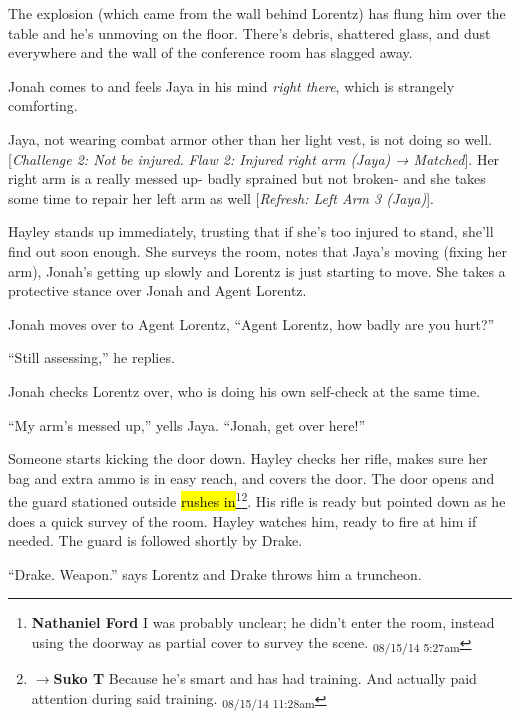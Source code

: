 The explosion (which came from the wall behind Lorentz) has flung him over the table and he's unmoving on the floor.  There's debris, shattered glass, and dust everywhere and the wall of the conference room has slagged away.  



Jonah comes to and feels Jaya in his mind \textit{right there}, which is strangely comforting.



Jaya, not wearing combat armor other than her light vest, is not doing so well. {[}\textit{Challenge 2: Not be injured.  }\textit{Flaw 2: Injured right arm (Jaya)}\textit{ → Matched}{]}.  Her right arm is a really messed up- badly sprained but not broken- and she takes some time to repair her left arm as well {[}\textit{Refresh: Left Arm 3 (Jaya)}{]}.



Hayley stands up immediately, trusting that if she's too injured to stand, she'll find out soon enough.  She surveys the room, notes that Jaya's moving (fixing her arm), Jonah's getting up slowly and Lorentz is just starting to move.  She takes a protective stance over Jonah and Agent Lorentz.



Jonah moves over to Agent Lorentz, ``Agent Lorentz, how badly are you hurt?''

``Still assessing,'' he replies.

Jonah checks Lorentz over, who is doing his own self-check at the same time.

``My arm's messed up,'' yells Jaya. ``Jonah, get over here!'' 



Someone starts kicking the door down.  Hayley checks her rifle, makes sure her bag and extra ammo is in easy reach, and covers the door.  The door opens and the guard stationed outside \hl{rushes in}\footnote{\textbf{Nathaniel Ford }I was probably unclear; he didn't enter the room, instead using the doorway as partial cover to survey the scene. \textsubscript{08/15/14 5:27am}}\footnote{$\rightarrow$\textbf{Suko T }Because he's smart and has had training.  And actually paid attention during said training. \textsubscript{08/15/14 11:28am}}.  His rifle is ready but pointed down as he does a quick survey of the room.  Hayley watches him, ready to fire at him if needed.  The guard is followed shortly by Drake.  

``Drake.  Weapon.'' says Lorentz and Drake throws him a truncheon.

